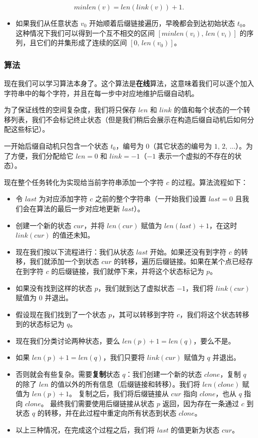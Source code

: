 $$
minlen(v)=len(link(v))+1.
$$

\begin{itemize}
\item 如果我们从任意状态 $v_0$ 开始顺着后缀链接遍历，早晚都会到达初始状态 $t_0$。这种情况下我们可以得到一个互不相交的区间 $[minlen(v_i),\,len(v_i)]$ 的序列，且它们的并集形成了连续的区间 $[0,\,len(v_0)]$。
\end{itemize}

\subsubsection{算法}

现在我们可以学习算法本身了。这个算法是\textbf{在线}算法，这意味着我们可以逐个加入字符串中的每个字符，并且在每一步中对应地维护后缀自动机。

为了保证线性的空间复杂度，我们将只保存 $len$ 和 $link$ 的值和每个状态的一个转移列表，我们不会标记终止状态（但是我们稍后会展示在构造后缀自动机后如何分配这些标记）。

一开始后缀自动机只包含一个状态 $t_0$，编号为 $0$（其它状态的编号为 $1,\,2,\,\ldots$）。为了方便，我们分配给它 $len=0$ 和 $link=-1$（$-1$ 表示一个虚拟的不存在的状态）。

现在整个任务转化为实现给当前字符串添加一个字符 $c$ 的过程。算法流程如下：

\begin{itemize}
\item 令 $last$ 为对应添加字符 $c$ 之前的整个字符串（一开始我们设置 $last=0$ 且我们会在算法的最后一步对应地更新 $last$）。
\item 创建一个新的状态 $cur$，并将 $len(cur)$ 赋值为 $len(last)+1$，在这时 $link(cur)$ 的值还未知。
\item 现在我们按以下流程进行：我们从状态 $last$ 开始。如果还没有到字符 $c$ 的转移，我们就添加一个到状态 $cur$ 的转移，遍历后缀链接。如果在某个点已经存在到字符 $c$ 的后缀链接，我们就停下来，并将这个状态标记为 $p$。
\item 如果没有找到这样的状态 $p$，我们就到达了虚拟状态 $-1$，我们将 $link(cur)$ 赋值为 $0$ 并退出。
\item 假设现在我们找到了一个状态 $p$，其可以转移到字符 $c$，我们将这个状态转移到的状态标记为 $q$。
\item 现在我们分类讨论两种状态，要么 $len(p) + 1 = len(q)$，要么不是。
\item 如果 $len(p)+1=len(q)$，我们只要将 $link(cur)$ 赋值为 $q$ 并退出。
\item 否则就会有些复杂。需要\textbf{复制}状态 $q$：我们创建一个新的状态 $clone$，复制 $q$ 的除了 $len$ 的值以外的所有信息（后缀链接和转移）。我们将 $len(clone)$ 赋值为 $len(p)+1$。  
复制之后，我们将后缀链接从 $cur$ 指向 $clone$，也从 $q$ 指向 $clone$。  
最终我们需要使用后缀链接从状态 $p$ 返回，因为存在一条通过 $c$ 到状态 $q$ 的转移，并在此过程中重定向所有状态到状态 $clone$。
\item 以上三种情况，在完成这个过程之后，我们将 $last$ 的值更新为状态 $cur$。
\end{itemize}

